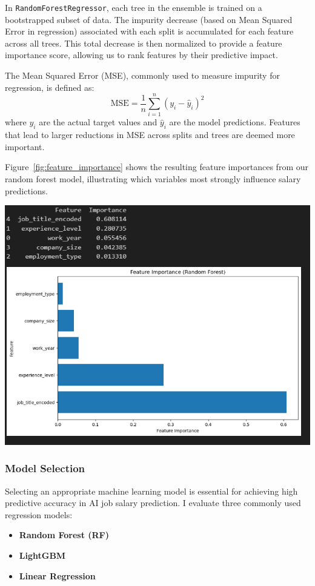 \documentclass[12pt,a4paper]{article}
\begin{document}
\begin{multicols}{2}
In \texttt{RandomForestRegressor}, each tree in the ensemble is trained on a bootstrapped subset of data. The impurity decrease (based on Mean Squared Error in regression) associated with each split is accumulated for each feature across all trees. This total decrease is then normalized to provide a feature importance score, allowing us to rank features by their predictive impact.

The Mean Squared Error (MSE), commonly used to measure impurity for regression, is defined as:
\[
\text{MSE} = \frac{1}{n} \sum_{i=1}^{n} (y_i - \hat{y}_i)^2
\]
where \(y_i\) are the actual target values and \(\hat{y}_i\) are the model predictions. Features that lead to larger reductions in MSE across splits and trees are deemed more important.

Figure~\ref{fig:feature_importance} shows the resulting feature importances from our random forest model, illustrating which variables most strongly influence salary predictions.

\includegraphics[width=\linewidth]{feature_importance.jpg}
\label{fig:feature_importance}

\subsubsection{Model Selection}
Selecting an appropriate machine learning model is essential for achieving high predictive accuracy in AI job salary prediction. I evaluate three commonly used regression models:

\begin{itemize}
    \item \textbf{Random Forest (RF)}
    \item \textbf{LightGBM}
    \item \textbf{Linear Regression}
\end{itemize}


\end{multicols}
\end{document}
